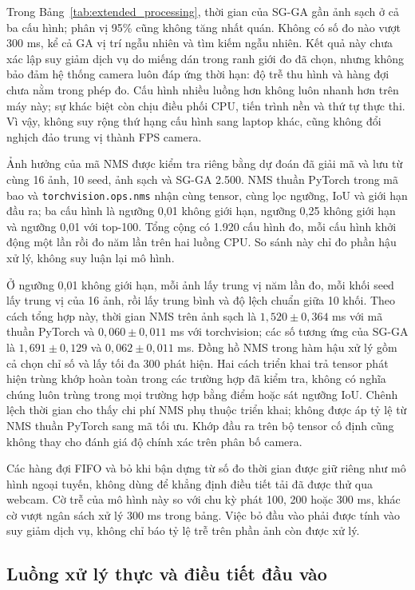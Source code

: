 \documentclass[a4paper,fleqn]{cas-dc}
\begin{document}
Trong Bảng~\ref{tab:extended_processing}, thời gian của SG-GA gần ảnh sạch ở cả ba cấu hình; phân vị 95\% cũng không tăng nhất quán. Không có số đo nào vượt 300 ms, kể cả GA vị trí ngẫu nhiên và tìm kiếm ngẫu nhiên. Kết quả này chưa xác lập suy giảm dịch vụ do miếng dán trong ranh giới đo đã chọn, nhưng không bảo đảm hệ thống camera luôn đáp ứng thời hạn: độ trễ thu hình và hàng đợi chưa nằm trong phép đo. Cấu hình nhiều luồng hơn không luôn nhanh hơn trên máy này; sự khác biệt còn chịu điều phối CPU, tiến trình nền và thứ tự thực thi. Vì vậy, không suy rộng thứ hạng cấu hình sang laptop khác, cũng không đổi nghịch đảo trung vị thành FPS camera.

Ảnh hưởng của mã NMS được kiểm tra riêng bằng dự đoán đã giải mã và lưu từ cùng 16 ảnh, 10 seed, ảnh sạch và SG-GA 2.500. NMS thuần PyTorch trong mã bao và \texttt{torchvision.ops.nms} nhận cùng tensor, cùng lọc ngưỡng, IoU và giới hạn đầu ra; ba cấu hình là ngưỡng 0,01 không giới hạn, ngưỡng 0,25 không giới hạn và ngưỡng 0,01 với top-100. Tổng cộng có 1.920 cấu hình đo, mỗi cấu hình khởi động một lần rồi đo năm lần trên hai luồng CPU. So sánh này chỉ đo phần hậu xử lý, không suy luận lại mô hình.

Ở ngưỡng 0,01 không giới hạn, mỗi ảnh lấy trung vị năm lần đo, mỗi khối seed lấy trung vị của 16 ảnh, rồi lấy trung bình và độ lệch chuẩn giữa 10 khối. Theo cách tổng hợp này, thời gian NMS trên ảnh sạch là $1{,}520\pm0{,}364$ ms với mã thuần PyTorch và $0{,}060\pm0{,}011$ ms với torchvision; các số tương ứng của SG-GA là $1{,}691\pm0{,}129$ và $0{,}062\pm0{,}011$ ms. Đồng hồ NMS trong hàm hậu xử lý gồm cả chọn chỉ số và lấy tối đa 300 phát hiện. Hai cách triển khai trả tensor phát hiện trùng khớp hoàn toàn trong các trường hợp đã kiểm tra, không có nghĩa chúng luôn trùng trong mọi trường hợp bằng điểm hoặc sát ngưỡng IoU. Chênh lệch thời gian cho thấy chi phí NMS phụ thuộc triển khai; không được áp tỷ lệ từ NMS thuần PyTorch sang mã tối ưu. Khớp đầu ra trên bộ tensor cố định cũng không thay cho đánh giá độ chính xác trên phân bố camera.

Các hàng đợi FIFO và bỏ khi bận dựng từ số đo thời gian được giữ riêng như mô hình ngoại tuyến, không dùng để khẳng định điều tiết tải đã được thử qua webcam. Cờ trễ của mô hình này so với chu kỳ phát 100, 200 hoặc 300 ms, khác cờ vượt ngân sách xử lý 300 ms trong bảng. Việc bỏ đầu vào phải được tính vào suy giảm dịch vụ, không chỉ báo tỷ lệ trễ trên phần ảnh còn được xử lý.

\subsection{Luồng xử lý thực và điều tiết đầu vào}
\label{sec:extended_stream}
\end{document}
